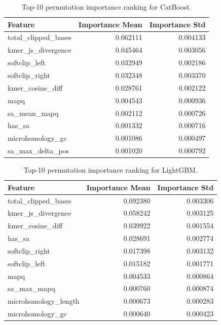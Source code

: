 \begin{table}[H]
\centering
\small
\caption{Top-10 permutation importance ranking for CatBoost.}
\label{tab:imp_catboost}
\begin{tabular}{lrr}
\toprule
Feature & Importance Mean & Importance Std \\
\midrule
total\_clipped\_bases & 0.062111 & 0.004133 \\
kmer\_js\_divergence & 0.045464 & 0.003056 \\
softclip\_left & 0.032949 & 0.002186 \\
softclip\_right & 0.032348 & 0.003370 \\
kmer\_cosine\_diff & 0.028761 & 0.002122 \\
mapq & 0.004543 & 0.000936 \\
sa\_mean\_mapq & 0.002112 & 0.000726 \\
has\_sa & 0.001332 & 0.000716 \\
microhomology\_gc & 0.001086 & 0.000497 \\
sa\_max\_delta\_pos & 0.001020 & 0.000792 \\
\bottomrule
\end{tabular}
\end{table}

\begin{table}[H]
\centering
\small
\caption{Top-10 permutation importance ranking for LightGBM.}
\label{tab:imp_lightgbm}
\begin{tabular}{lrr}
\toprule
Feature & Importance Mean & Importance Std \\
\midrule
total\_clipped\_bases & 0.092380 & 0.003306 \\
kmer\_js\_divergence & 0.058242 & 0.003125 \\
kmer\_cosine\_diff & 0.039922 & 0.001554 \\
has\_sa & 0.028691 & 0.002774 \\
softclip\_right & 0.017398 & 0.003132 \\
softclip\_left & 0.015182 & 0.001771 \\
mapq & 0.004533 & 0.000864 \\
sa\_max\_mapq & 0.000760 & 0.000874 \\
microhomology\_length & 0.000673 & 0.000283 \\
microhomology\_gc & 0.000640 & 0.000423 \\
\bottomrule
\end{tabular}
\end{table}

